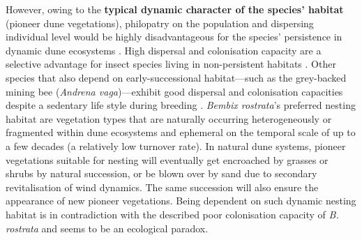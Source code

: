 \documentclass[10pt, twoside]{book} %
\begin{document}
	However, owing to the \textbf{typical dynamic character of the species' habitat} (pioneer dune vegetations), philopatry on the population and dispersing individual level would be highly disadvantageous for the species' persistence in dynamic dune ecosystems \citep{bogusch2021}. High dispersal and colonisation capacity are a selective advantage for insect species living in non-persistent habitats \citep{denno1996, bowler2005}. Other species that also depend on early-successional habitat---such as the grey-backed mining bee (\textit{Andrena vaga})---exhibit good dispersal and colonisation capacities despite a sedentary life style during breeding \citep{exeler2008, cerna2013}. \textit{Bembix rostrata}'s preferred nesting habitat are vegetation types that are naturally occurring heterogeneously or fragmented within dune ecosystems and ephemeral on the temporal scale of up to a few decades (a relatively low turnover rate). In natural dune systems, pioneer vegetations suitable for nesting will eventually get encroached by grasses or shrubs by natural succession, or be blown over by sand due to secondary revitalisation of wind dynamics. The same succession will also ensure the appearance of new pioneer vegetations. Being dependent on such dynamic nesting habitat is in contradiction with the described poor colonisation capacity of \textit{B. rostrata} and seems to be an ecological paradox.\\
	
\end{document}
